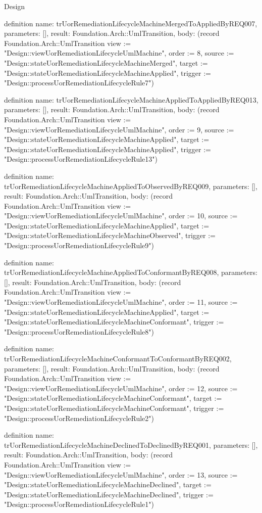 \begin{lexlean}{Design}
\begin{semanticmodule}
definition{
  name: trUorRemediationLifecycleMachineMergedToAppliedByREQ007,
  parameters: [],
  result: Foundation.Arch::UmlTransition,
  body: (record Foundation.Arch::UmlTransition {view := "Design::viewUorRemediationLifecycleUmlMachine", order := 8, source := "Design::stateUorRemediationLifecycleMachineMerged", target := "Design::stateUorRemediationLifecycleMachineApplied", trigger := "Design::processUorRemediationLifecycleRule7"})
}

definition{
  name: trUorRemediationLifecycleMachineAppliedToAppliedByREQ013,
  parameters: [],
  result: Foundation.Arch::UmlTransition,
  body: (record Foundation.Arch::UmlTransition {view := "Design::viewUorRemediationLifecycleUmlMachine", order := 9, source := "Design::stateUorRemediationLifecycleMachineApplied", target := "Design::stateUorRemediationLifecycleMachineApplied", trigger := "Design::processUorRemediationLifecycleRule13"})
}

definition{
  name: trUorRemediationLifecycleMachineAppliedToObservedByREQ009,
  parameters: [],
  result: Foundation.Arch::UmlTransition,
  body: (record Foundation.Arch::UmlTransition {view := "Design::viewUorRemediationLifecycleUmlMachine", order := 10, source := "Design::stateUorRemediationLifecycleMachineApplied", target := "Design::stateUorRemediationLifecycleMachineObserved", trigger := "Design::processUorRemediationLifecycleRule9"})
}

definition{
  name: trUorRemediationLifecycleMachineAppliedToConformantByREQ008,
  parameters: [],
  result: Foundation.Arch::UmlTransition,
  body: (record Foundation.Arch::UmlTransition {view := "Design::viewUorRemediationLifecycleUmlMachine", order := 11, source := "Design::stateUorRemediationLifecycleMachineApplied", target := "Design::stateUorRemediationLifecycleMachineConformant", trigger := "Design::processUorRemediationLifecycleRule8"})
}

definition{
  name: trUorRemediationLifecycleMachineConformantToConformantByREQ002,
  parameters: [],
  result: Foundation.Arch::UmlTransition,
  body: (record Foundation.Arch::UmlTransition {view := "Design::viewUorRemediationLifecycleUmlMachine", order := 12, source := "Design::stateUorRemediationLifecycleMachineConformant", target := "Design::stateUorRemediationLifecycleMachineConformant", trigger := "Design::processUorRemediationLifecycleRule2"})
}

definition{
  name: trUorRemediationLifecycleMachineDeclinedToDeclinedByREQ001,
  parameters: [],
  result: Foundation.Arch::UmlTransition,
  body: (record Foundation.Arch::UmlTransition {view := "Design::viewUorRemediationLifecycleUmlMachine", order := 13, source := "Design::stateUorRemediationLifecycleMachineDeclined", target := "Design::stateUorRemediationLifecycleMachineDeclined", trigger := "Design::processUorRemediationLifecycleRule1"})
}


\end{semanticmodule}
\end{lexlean}
